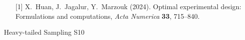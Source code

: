 \begin{session}
 \medskip
 \begin{enumerate}
 \item[{[1]}] X.\ Huan, J.\ Jagalur, Y.\ Marzouk (2024). Optimal experimental design: Formulations and computations, \textit{Acta Numerica} \textbf{33}, 715--840.
 \end{enumerate}
\end{session}



\clearpage

\begin{session}
 {Heavy-tailed Sampling}%
 {}%
 {}%
 {}%
 {}%
 {}%
 {}%
 {S10}%
 {\thirdorganizer{}{}{}}%


\end{session}
